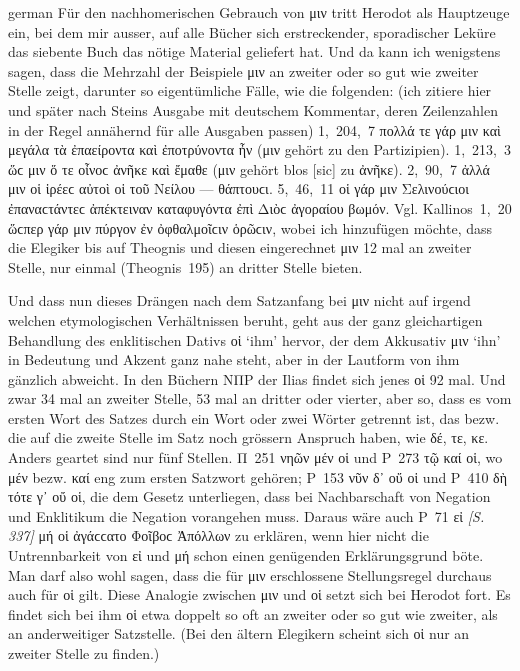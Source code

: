 \begin{otherlanguage*}{german}
Für den nachhomerischen Gebrauch von μιν tritt Herodot als Hauptzeuge ein, bei dem mir ausser, auf alle Bücher sich erstreckender, sporadischer Leküre das siebente Buch das nötige Material geliefert hat. Und da kann ich wenigstens sagen, dass die Mehrzahl der Beispiele μιν an zweiter oder so gut wie zweiter Stelle zeigt, darunter so eigentümliche Fälle, wie die folgenden: (ich zitiere hier und später nach Steins Ausgabe mit deutschem Kommentar, deren Zeilenzahlen in der Regel annähernd für alle Ausgaben passen) 1,~204,~7 πολλά τε γάρ μιν καὶ μεγάλα τὰ ἐπαείροντα καὶ ἐποτρύνοντα ἦν (μιν gehört zu den Partizipien). 1,~213,~3 ὥϲ μιν ὅ τε οἶνοϲ ἀνῆκε καὶ ἔμαθε (μιν gehört blos [sic] zu ἀνῆκε). 2,~90,~7 ἀλλά μιν οἱ ἱρέεϲ αὐτοὶ οἱ τοῦ Νείλου — θάπτουϲι. 5,~46,~11 οἱ γάρ μιν Σελινούϲιοι ἐπαναϲτάντεϲ ἀπέκτειναν καταφυγόντα ἐπὶ Διὸϲ ἀγοραίου βωμόν. Vgl. Kallinos~1,~20 ὥϲπερ γάρ μιν πύργον ἐν ὀφθαλμοῖϲιν ὁρῶϲιν, wobei ich hinzufügen möchte, dass die Elegiker bis auf Theognis und diesen eingerechnet μιν 12 mal an zweiter Stelle, nur einmal (Theognis~195) an dritter Stelle bieten.

Und dass nun dieses Drängen nach dem Satzanfang bei μιν nicht auf irgend welchen etymologischen Verhältnissen beruht, geht aus der ganz gleichartigen Behandlung des enklitischen Dativs οἱ ‘ihm’ hervor, der dem Akkusativ μιν ‘ihn’ in Bedeutung und Akzent ganz nahe steht, aber in der Lautform von ihm gänzlich abweicht. In den Büchern ΝΠΡ der Ilias findet sich jenes οἱ 92 mal. Und zwar 34 mal an zweiter Stelle, 53 mal an dritter oder vierter, aber so, dass es vom ersten Wort des Satzes durch ein Wort oder zwei Wörter getrennt ist, das bezw. die auf die zweite Stelle im Satz noch grössern Anspruch haben, wie δέ, τε, κε. Anders geartet sind nur fünf Stellen. Π~251 νηῶν μέν οἱ und Ρ~273 τῷ καί οἱ, wo μέν bezw. καί eng zum ersten Satzwort gehören; Ρ~153 νῦν δ᾽ οὔ οἱ und Ρ~410 δὴ τότε γ᾽ οὔ οἱ, die dem Gesetz unterliegen, dass bei Nachbarschaft von Negation und Enklitikum die Negation vorangehen muss. Daraus wäre auch Ρ~71 εἰ \hypertarget{p337}{\emph{[S. 337]}}\label{p337} μή οἱ ἀγάϲϲατο Φοῖβοϲ Ἀπόλλων zu erklären, wenn hier nicht die Untrennbarkeit von εἰ und μή schon einen genügenden Erklärungsgrund böte. Man darf also wohl sagen, dass die für μιν erschlossene Stellungsregel durchaus auch für οἱ gilt.
Diese Analogie zwischen μιν und οἱ setzt sich bei Herodot fort. Es findet sich bei ihm οἱ etwa doppelt so oft an zweiter oder so gut wie zweiter, als an anderweitiger Satzstelle. (Bei den ältern Elegikern scheint sich οἱ nur an zweiter Stelle zu finden.)


\end{otherlanguage*}
